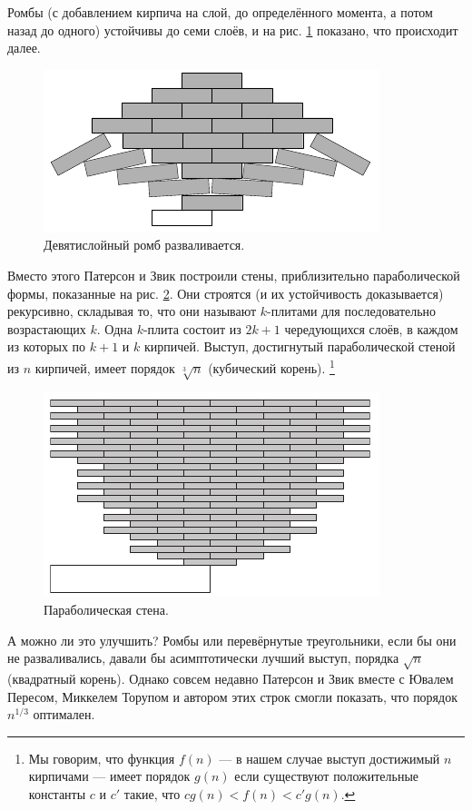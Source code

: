 Ромбы (с добавлением кирпича на слой, до определённого момента, а потом назад до одного) устойчивы до семи слоёв, и на рис. \ref{pic:kirpich6} показано, что происходит далее.

\begin{figure}[htb!]
\centering
\includegraphics[scale=1]{pics/kirpich6}
\caption{Девятислойный ромб разваливается.}
\label{pic:kirpich6}
\end{figure}

Вместо этого Патерсон и Звик построили стены, приблизительно параболической формы, показанные на рис. \ref{pic:kirpich7}.
Они строятся (и их устойчивость доказывается) рекурсивно, складывая то, что они называют $k$-плитами для последовательно возрастающих $k$.
Одна $k$-плита состоит из $2k + 1$ чередующихся слоёв, в каждом из которых по $k + 1$ и $k$ кирпичей.
Выступ, достигнутый параболической стеной из $n$ кирпичей, имеет порядок $\sqrt[3]{n}$ (кубический корень).%
\footnote{Мы говорим, что функция $f (n)$ --- в нашем случае выступ достижимый $n$ кирпичами --- имеет порядок $g(n)$ если существуют положительные константы $c$ и $c'$ такие, что $cg(n) < f (n) < c' g(n)$.}

\begin{figure}[htb!]
\centering
\includegraphics[scale=1]{pics/kirpich7}
\caption{Параболическая стена.}
\label{pic:kirpich7}
\end{figure}

А можно ли это улучшить?
Ромбы или перевёрнутые треугольники, если бы они не разваливались, давали бы асимптотически лучший выступ, порядка $\sqrt{n}$ (квадратный корень).
Однако совсем недавно Патерсон и Звик вместе с Ювалем Пересом, Миккелем Торупом и автором этих строк \cite{48} смогли показать, что порядок $n^{1/3}$ оптимален.

